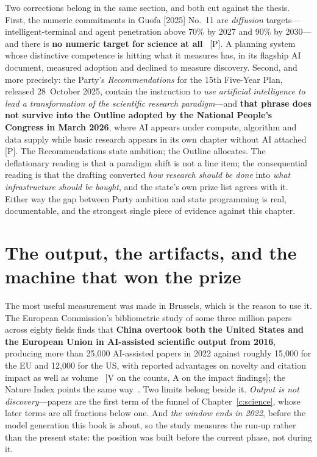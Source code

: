 Two corrections belong in the same section, and both cut against the thesis. First, the numeric commitments in Guofa [2025] No.~11 are \emph{diffusion} targets---intelligent-terminal and agent penetration above 70\% by 2027 and 90\% by 2030---and there is \textbf{no numeric target for science at all}~\cite{ai-plus-science} [P]. A planning system whose distinctive competence is hitting what it measures has, in its flagship AI document, measured adoption and declined to measure discovery. Second, and more precisely: the Party's \emph{Recommendations} for the 15th Five-Year Plan, released 28~October 2025, contain the instruction to \emph{use artificial intelligence to lead a transformation of the scientific research paradigm}---and \textbf{that phrase does not survive into the Outline adopted by the National People's Congress in March 2026}, where AI appears under compute, algorithm and data supply while basic research appears in its own chapter without AI attached~\cite{fyp15-ai4s} [P]. The Recommendations state ambition; the Outline allocates. The deflationary reading is that a paradigm shift is not a line item; the consequential reading is that the drafting converted \emph{how research should be done} into \emph{what infrastructure should be bought}, and the state's own prize list agrees with it. Either way the gap between Party ambition and state programming is real, documentable, and the strongest single piece of evidence against this chapter.

\section{The output, the artifacts, and the machine that won the prize}

The most useful measurement was made in Brussels, which is the reason to use it. The European Commission's bibliometric study of some three million papers across eighty fields finds that \textbf{China overtook both the United States and the European Union in AI-assisted scientific output from 2016}, producing more than 25{,}000 AI-assisted papers in 2022 against roughly 15{,}000 for the EU and 12{,}000 for the US, with reported advantages on novelty and citation impact as well as volume~\cite{ec-ai4s-biblio} [V on the counts, A on the impact findings]; the Nature Index points the same way~\cite{nature-index-2026}. Two limits belong beside it. \emph{Output is not discovery}---papers are the first term of the funnel of Chapter~\ref{c:science}, whose later terms are all fractions below one. And \emph{the window ends in 2022}, before the model generation this book is about, so the study measures the run-up rather than the present state: the position was built before the current phase, not during it.

